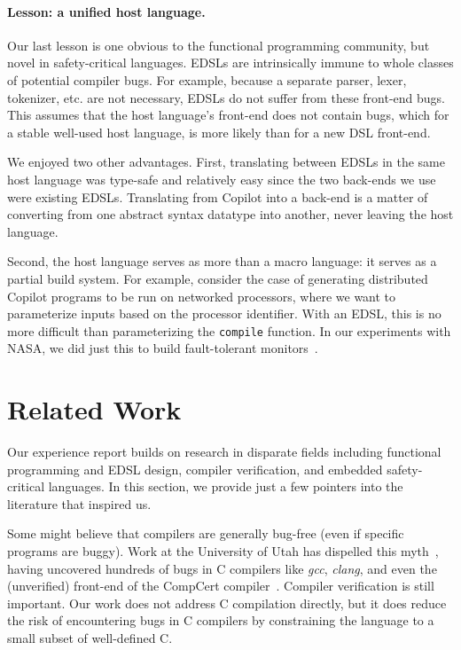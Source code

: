 \documentclass[9pt]{sigplanconf}
\begin{document}

\paragraph{Lesson: a unified host language.}
Our last lesson is one obvious to the functional programming community, but
novel in safety-critical languages.  EDSLs are intrinsically immune to whole classes of
potential compiler bugs.  For example, because a separate parser, lexer,
tokenizer, etc. are not necessary, EDSLs do not suffer from these front-end
bugs.  This assumes that the host language's front-end does not contain bugs,
which for a stable well-used host language, is more likely than for a new DSL
front-end.  

We enjoyed two other advantages.  First, translating between EDSLs in the same
host language was type-safe and relatively easy since the two back-ends we use were
existing EDSLs.  Translating from Copilot into a back-end is a matter of
converting from one abstract syntax datatype into another, never leaving the host
language.  

Second, the host language serves as more than a macro language: it serves as a
partial build system.  For example, consider the case of generating distributed
Copilot programs to be run on networked processors, where we want to
parameterize inputs based on the processor identifier.  With an EDSL, this is no
more difficult than parameterizing the {\tt compile} function.  In our
experiments with NASA, we did just this to build fault-tolerant
monitors~\cite{pike-rv-11}.


\section{Related Work}
\label{sec:related}

Our experience report builds on research in disparate fields including
functional programming and EDSL design, compiler verification, and embedded
safety-critical languages.  In this section, we provide just a few pointers into
the literature that inspired us.

Some might believe that compilers are generally bug-free (even if specific
programs are buggy).  Work at the University of Utah has dispelled this
myth~\cite{rehger}, having uncovered hundreds of bugs in C compilers like
\emph{gcc}, \emph{clang}, and even the (unverified) front-end of the CompCert
compiler~\cite{leroy}.  Compiler verification is still important.  Our work does
not address C compilation directly, but it does reduce the risk of encountering
bugs in C compilers by constraining the language to a small subset of
well-defined C.
\end{document}
